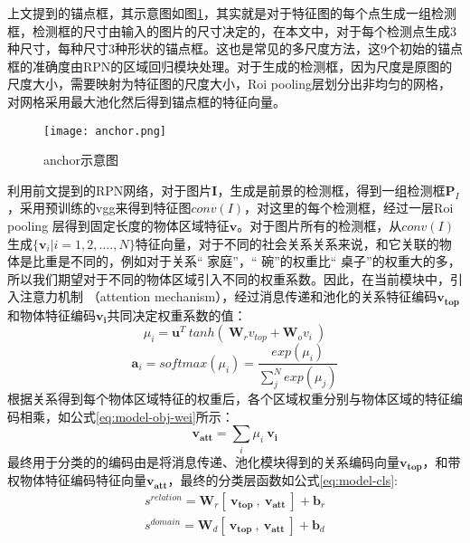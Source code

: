 上文提到的锚点框，其示意图如图\ref{fig:anchor}，其实就是对于特征图的每个点生成一组检测框，检测框的尺寸由输入的图片的尺寸决定的，在本文中，对于每个检测点生成3种尺寸，每种尺寸3种形状的锚点框。这也是常见的多尺度方法，这9个初始的锚点框的准确度由RPN的区域回归模块处理。对于生成的检测框，因为尺度是原图的尺度大小，需要映射为特征图的尺度大小，Roi pooling层划分出非均匀的网格，对网格采用最大池化然后得到锚点框的特征向量。
\begin{figure}[htpb]
	\centering
	\texttt{[image: anchor.png]}
    \caption{anchor示意图}
	\vspace*{-3.5mm}
	\label{fig:anchor}
\end{figure}

利用前文提到的RPN网络，对于图片$\bm{I}$，生成是前景的检测框，得到一组检测框$\bm{P}_{I}$，采用预训练的vgg来得到特征图$conv(I)$，对这里的每个检测框，经过一层Roi pooling 层得到固定长度的物体区域特征$\mathbf{v}$。对于图片所有的检测框，从$conv(I)$生成$\{ \mathbf{v}_{i}|i=1,2,....,N\}$特征向量，对于不同的社会关系关系来说，和它关联的物体是比重是不同的，例如对于关系`` 家庭''，`` 碗''的权重比`` 桌子''的权重大的多，所以我们期望对于不同的物体区域引入不同的权重系数。因此，在当前模块中，引入注意力机制
（attention mechanism），经过消息传递和池化的关系特征编码$\mathbf{v_{top}}$和物体特征编码$\mathbf{v_{i}}$共同决定权重系数的值：
\begin{equation}
    \mu_{i} = \mathbf{u}^{T}~tanh(~\mathbf{W}_{r}v_{top}+\mathbf{W}_{o}v_{i}~)
\end{equation}
\begin{equation}
    \mathbf{a}_{i} = softmax(\mu_i) = \frac{exp(\mu_{i})}{\sum_{j}^{N}exp(\mu_{j})}
\end{equation}
根据关系得到每个物体区域特征的权重后，各个区域权重分别与物体区域的特征编码相乘，如公式\ref{eq:model-obj-wei}所示：
\begin{equation}
    \label{eq:model-obj-wei}
    \mathbf{v_{att}} = \sum_{i}\mu_{i}~\mathbf{v_{i}}
\end{equation}
最终用于分类的的编码由是将消息传递、池化模块得到的关系编码向量$\mathbf{v_{top}}$，和带权物体特征编码特征向量$\mathbf{v_{att}}$，最终的分类层函数如公式\ref{eq:model-cls}:
\begin{equation}
    \label{eq:model-cls}
    \begin{split}
    s^{relation} = \mathbf{W}_{r}[~\mathbf{v_{top}}~,~\mathbf{v_{att}}~] + \mathbf{b}_r \\
    s^{domain} = \mathbf{W}_{d}[~\mathbf{v_{top}}~,~\mathbf{v_{att}}~] + \mathbf{b}_d 
    \end{split}
\end{equation}

